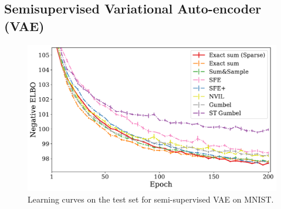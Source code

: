 \subsection{Semisupervised Variational Auto-encoder (VAE)}\label{sec:gen}

\begin{figure}[htbp]
    \centering
    \includegraphics[width=.9\textwidth]{Figures/ss_mnist_elbo_path.pdf}
    \caption{\label{fig:ssvaeelbo}Learning curves on the test set for semi-supervised VAE on MNIST.}
\end{figure}


